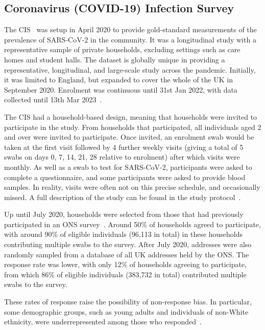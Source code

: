 \documentclass[thesis.tex]{subfiles}
\begin{document}
\subsection{Coronavirus (COVID-19) Infection Survey} \label{intro:sec:cis}

The CIS~\autocite{CIS} was setup in April 2020 to provide gold-standard measurements of the prevalence of SARS-CoV-2 in the community.
It was a longitudinal study with a representative sample of private households, \ie excluding settings such as care homes and student halls.
The dataset is globally unique in providing a representative, longitudinal, and large-scale study across the pandemic.
Initially, it was limited to England, but expanded to cover the whole of the UK in September 2020.
Enrolment was continuous until 31st Jan 2022, with data collected until 13th Mar 2023~\autocite{weiRisk}. 

The CIS had a household-based design, meaning that households were invited to participate in the study.
From households that participated, all individuals aged 2 and over were invited to participate.
Once invited, an enrolment swab would be taken at the first visit followed by 4 further weekly visits (giving a total of 5 swabs on days 0, 7, 14, 21, 28 relative to enrolment) after which visits were monthly.
As well as a swab to test for SARS-CoV-2, participants were asked to complete a questionnaire, and some participants were asked to provide blood samples.
In reality, visits were often not on this precise schedule, and occasionally missed.
A full description of the study can be found in the study protocol~\autocite{cisProtocol}.

Up until July 2020, households were selected from those that had previously participated in an ONS survey~\autocite{CIStechData}.
Around 50\% of households agreed to participate, with around 90\% of eligible individuals (96,113 in total) in these households contributing multiple swabs to the survey.
After July 2020, addresses were also randomly sampled from a database of all UK addresses held by the ONS.
The response rate was lower, with only 12\% of households agreeing to participate, from which 86\% of eligible individuals (383,732 in total) contributed multiple swabs to the survey.

These rates of response raise the possibility of non-response bias.
In particular, some demographic groups, such as young adults and individuals of non-White ethnicity, were underrepresented among those who responded~\autocite{pouwelsCommunity}.
\end{document}
